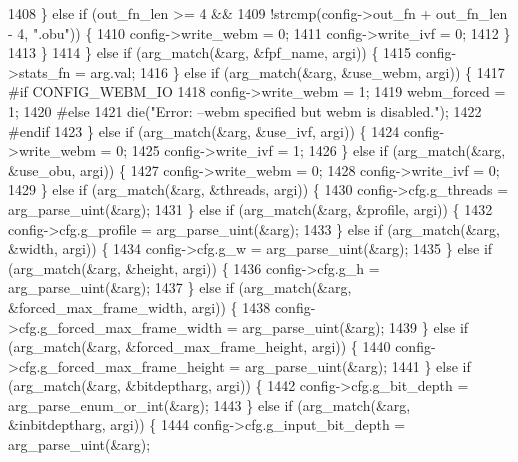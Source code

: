 \begin{DoxyCodeInclude}
{{{{{{{{{{{{{{{{1408         \} \textcolor{keywordflow}{else} \textcolor{keywordflow}{if} (out\_fn\_len >= 4 &&
1409                    !strcmp(config->out\_fn + out\_fn\_len - 4, \textcolor{stringliteral}{".obu"})) \{
1410           config->write\_webm = 0;
1411           config->write\_ivf = 0;
1412         \}
1413       \}
1414     \} \textcolor{keywordflow}{else} \textcolor{keywordflow}{if} (arg\_match(&arg, &fpf\_name, argi)) \{
1415       config->stats\_fn = arg.val;
1416     \} \textcolor{keywordflow}{else} \textcolor{keywordflow}{if} (arg\_match(&arg, &use\_webm, argi)) \{
1417 \textcolor{preprocessor}{#if CONFIG\_WEBM\_IO}
1418       config->write\_webm = 1;
1419       webm\_forced = 1;
1420 \textcolor{preprocessor}{#else}
1421       die(\textcolor{stringliteral}{"Error: --webm specified but webm is disabled."});
1422 \textcolor{preprocessor}{#endif}
1423     \} \textcolor{keywordflow}{else} \textcolor{keywordflow}{if} (arg\_match(&arg, &use\_ivf, argi)) \{
1424       config->write\_webm = 0;
1425       config->write\_ivf = 1;
1426     \} \textcolor{keywordflow}{else} \textcolor{keywordflow}{if} (arg\_match(&arg, &use\_obu, argi)) \{
1427       config->write\_webm = 0;
1428       config->write\_ivf = 0;
1429     \} \textcolor{keywordflow}{else} \textcolor{keywordflow}{if} (arg\_match(&arg, &threads, argi)) \{
1430       config->cfg.g\_threads = arg\_parse\_uint(&arg);
1431     \} \textcolor{keywordflow}{else} \textcolor{keywordflow}{if} (arg\_match(&arg, &profile, argi)) \{
1432       config->cfg.g\_profile = arg\_parse\_uint(&arg);
1433     \} \textcolor{keywordflow}{else} \textcolor{keywordflow}{if} (arg\_match(&arg, &width, argi)) \{
1434       config->cfg.g\_w = arg\_parse\_uint(&arg);
1435     \} \textcolor{keywordflow}{else} \textcolor{keywordflow}{if} (arg\_match(&arg, &height, argi)) \{
1436       config->cfg.g\_h = arg\_parse\_uint(&arg);
1437     \} \textcolor{keywordflow}{else} \textcolor{keywordflow}{if} (arg\_match(&arg, &forced\_max\_frame\_width, argi)) \{
1438       config->cfg.g\_forced\_max\_frame\_width = arg\_parse\_uint(&arg);
1439     \} \textcolor{keywordflow}{else} \textcolor{keywordflow}{if} (arg\_match(&arg, &forced\_max\_frame\_height, argi)) \{
1440       config->cfg.g\_forced\_max\_frame\_height = arg\_parse\_uint(&arg);
1441     \} \textcolor{keywordflow}{else} \textcolor{keywordflow}{if} (arg\_match(&arg, &bitdeptharg, argi)) \{
1442       config->cfg.g\_bit\_depth = arg\_parse\_enum\_or\_int(&arg);
1443     \} \textcolor{keywordflow}{else} \textcolor{keywordflow}{if} (arg\_match(&arg, &inbitdeptharg, argi)) \{
1444       config->cfg.g\_input\_bit\_depth = arg\_parse\_uint(&arg);
}}}}}}}}}}}}}}}}
\end{DoxyCodeInclude}

